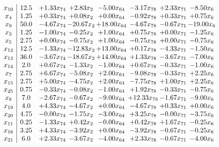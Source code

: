 \documentclass[8pt]{article}
\begin{document}
\[\begin{array}{c| c c@{\hskip 2pt} c@{\hskip 2pt} c@{\hskip 2pt} c@{\hskip 2pt} c@{\hskip 2pt} c@{\hskip 2pt} }
 x_{10}   &  12.5 & +  1.33 x_{74} & +  2.83 x_{2} & -5.00 x_{64} & -3.17 x_{78} & +  2.33 x_{71} & -8.50 x_{6}\\
 x_{4}   &  1.25 & +  0.33 x_{74} & +  0.08 x_{2} & +  0.00 x_{64} & -0.92 x_{78} & +  0.33 x_{71} & +  0.75 x_{6}\\
 x_{9}   &  50.0 & -4.67 x_{74} & -20.67 x_{2} & + 18.00 x_{64} & -4.67 x_{78} & -0.67 x_{71} & -19.00 x_{6}\\
 x_{3}   &  1.25 & -1.00 x_{74} & -0.25 x_{2} & +  1.00 x_{64} & +  0.75 x_{78} & +  0.00 x_{71} & -1.25 x_{6}\\
 x_{5}   &  2.75 & +  0.00 x_{74} & -0.75 x_{2} & +  1.00 x_{64} & -0.75 x_{78} & +  0.00 x_{71} & -0.75 x_{6}\\
 x_{12}   &  12.5 & -1.33 x_{74} & -12.83 x_{2} & + 13.00 x_{64} & +  0.17 x_{78} & -4.33 x_{71} & -1.50 x_{6}\\
 x_{13}   &  36.0 & -3.67 x_{74} & -18.67 x_{2} & + 14.00 x_{64} & +  1.33 x_{78} & -3.67 x_{71} & -7.00 x_{6}\\
 x_{14}   &  2.0 & +  0.67 x_{74} & -1.33 x_{2} & -1.00 x_{64} & +  0.67 x_{78} & -0.33 x_{71} & -1.00 x_{6}\\
 x_{7}   &  2.75 & +  6.67 x_{74} & -5.08 x_{2} & +  2.00 x_{64} & -9.08 x_{78} & -0.33 x_{71} & +  2.25 x_{6}\\
 x_{15}   &  2.75 & +  5.00 x_{74} & -4.75 x_{2} & +  2.00 x_{64} & -7.75 x_{78} & +  1.00 x_{71} & +  2.25 x_{6}\\
 x_{25}   &  0.75 & -0.33 x_{74} & -0.08 x_{2} & -1.00 x_{64} & +  1.92 x_{78} & -0.33 x_{71} & -0.75 x_{6}\\
 x_{8}   &  7.0 & -2.67 x_{74} & -0.67 x_{2} & -9.00 x_{64} & + 12.33 x_{78} & -1.67 x_{71} & -9.00 x_{6}\\
 x_{19}   &  4.0 & +  4.33 x_{74} & -4.67 x_{2} & +  0.00 x_{64} & -4.67 x_{78} & +  0.33 x_{71} & +  0.00 x_{6}\\
 x_{20}   &  4.75 & -0.00 x_{74} & -1.75 x_{2} & -3.00 x_{64} & +  3.25 x_{78} & -0.00 x_{71} & -3.75 x_{6}\\
 x_{11}   &  0.25 & -1.33 x_{74} & +  0.42 x_{2} & -0.00 x_{64} & +  0.42 x_{78} & +  1.67 x_{71} & -0.25 x_{6}\\
 x_{16}   &  3.25 & +  4.33 x_{74} & -3.92 x_{2} & +  0.00 x_{64} & -3.92 x_{78} & -0.67 x_{71} & -0.25 x_{6}\\
 x_{21}   &  6.0 & +  2.33 x_{74} & -3.67 x_{2} & -4.00 x_{64} & +  2.33 x_{78} & -0.67 x_{71} & -4.00 x_{6}\\

\end{array}\]
\end{document}
